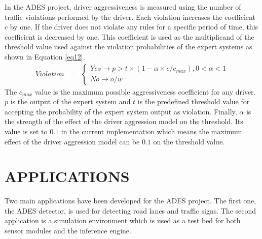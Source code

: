 \documentclass[a4paper,oneside,12pt]{report}
\begin{document}
In the ADES project, driver aggressiveness is measured using the number of traffic violations performed by the driver. Each violation increases the coefficient $c$ by one. If the driver does not violate any rules for a specific period of time, this coefficient is decreased by one. This coefficient is used as the multiplicand of the threshold value used against the violation probabilities of the expert systems as shown in Equation \ref{eq12}.
\begin{eqnarray}
\label{eq12}
Violation &=& \left\{\begin{array}{l} Yes \rightarrow p>t\times(1-\alpha{\times}c/c_{max}), 0<\alpha<1 \\ No \rightarrow o/w \end{array}\right.
\end{eqnarray}
The $c_{max}$ value is the maximum possible aggressiveness coefficient for any driver. $p$ is the output of the expert system and $t$ is the predefined threshold value for accepting the probability of the expert system output as violation. Finally, $\alpha$ is the strength of the effect of the driver aggression model on the threshold. Its value is set to $0.1$ in the current implementation which means the maximum effect of the driver aggression model can be $0.1$ on the threshold value.

\chapter{APPLICATIONS}
\label{chapapp}
Two main applications have been developed for the ADES project. The first one, the ADES detector, is used for detecting road lanes and traffic signs. The second application is a simulation environment which is used as a test bed for both sensor modules and the inference engine. 
\end{document}
